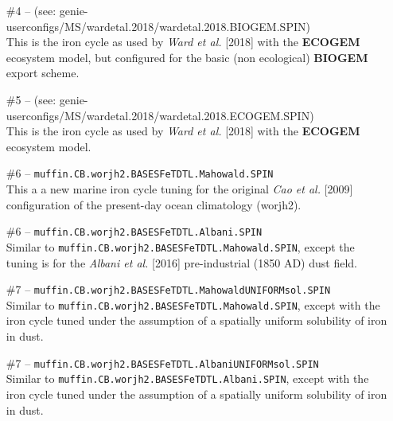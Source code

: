 \begin{itemize}[noitemsep]
\vspace{1mm}
\item [\#4] -- (see: \textsf{\footnotesize genie-userconfigs/MS/wardetal.2018/wardetal.2018.BIOGEM.SPIN})
\vspace{1mm}
\\This is the iron cycle as used by \textit{Ward et al.} [2018] with the \textbf{ECOGEM} ecosystem model, but configured for the basic (non ecological) \textbf{BIOGEM} export scheme. 
\vspace{1mm}
\item [\#5] -- (see: \textsf{\footnotesize genie-userconfigs/MS/wardetal.2018/wardetal.2018.ECOGEM.SPIN})
\vspace{1mm}
\\This is the iron cycle as used by \textit{Ward et al.} [2018] with the \textbf{ECOGEM} ecosystem model.
\vspace{1mm}
\item [\#6] -- \texttt{muffin.CB.worjh2.BASESFeTDTL.Mahowald.SPIN}
\vspace{1mm}
\\This a a new marine iron cycle tuning for the original \textit{Cao et al.} [2009] configuration of the present-day ocean climatology (\textsf{\footnotesize worjh2}).
\vspace{1mm}
\item [\#6] -- \texttt{muffin.CB.worjh2.BASESFeTDTL.Albani.SPIN}
\vspace{1mm}
\\Similar to \texttt{\small muffin.CB.worjh2.BASESFeTDTL.Mahowald.SPIN}, except the tuning is for the \textit{Albani et al.} [2016] pre-industrial (1850 AD) dust field.
\vspace{1mm}
\item [\#7] -- \texttt{muffin.CB.worjh2.BASESFeTDTL.MahowaldUNIFORMsol.SPIN}
\vspace{1mm}
\\Similar to \texttt{\small muffin.CB.worjh2.BASESFeTDTL.Mahowald.SPIN}, except with the iron cycle tuned under the assumption of a spatially uniform solubility of iron in dust.
\vspace{1mm}
\item [\#7] -- \texttt{muffin.CB.worjh2.BASESFeTDTL.AlbaniUNIFORMsol.SPIN}
\vspace{1mm}
\\Similar to \texttt{\small muffin.CB.worjh2.BASESFeTDTL.Albani.SPIN}, except with the iron cycle tuned under the assumption of a spatially uniform solubility of iron in dust.
\end{itemize}
\vspace{2mm}

